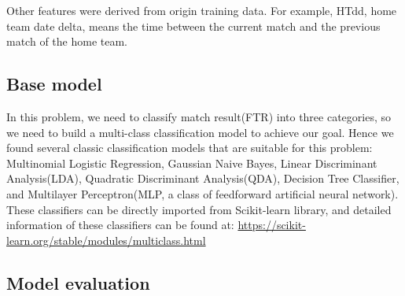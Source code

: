 \documentclass{article}
\begin{document}
Other features were derived from origin training data. For example, HTdd, home team date delta, means the time between the current match and the previous match of the home team. 


\subsection{Base model}
In this problem, we need to classify match result(FTR) into three categories, so we need to build a multi-class classification model to achieve our goal. Hence we found several classic classification models that are suitable for this problem: Multinomial Logistic Regression, Gaussian Naive Bayes, Linear Discriminant Analysis(LDA), Quadratic Discriminant Analysis(QDA), Decision Tree Classifier, and Multilayer Perceptron(MLP, a class of feedforward artificial neural network). These classifiers can be directly imported from Scikit-learn library, and detailed information of these classifiers can be found at:  \url{https://scikit-learn.org/stable/modules/multiclass.html}

\subsection{Model evaluation}
\end{document}
